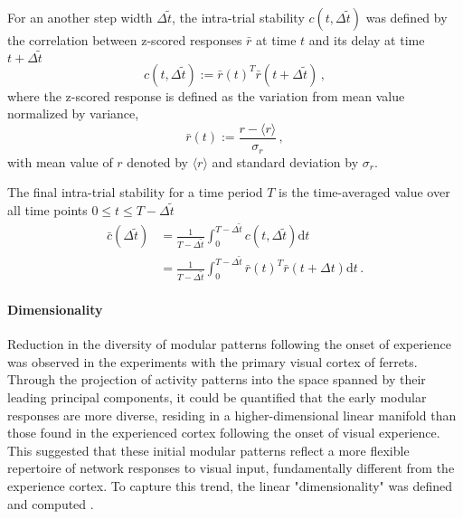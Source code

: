 \documentclass[11pt]{article}
\begin{document}
	For an another step width $\Delta \tilde{t}$, the intra-trial stability $c(t, \Delta \tilde{t})$ was defined by the correlation between z-scored responses $\bar{r}$ at time $t$ and its delay at time $t + \Delta \tilde{t}$ 
		\begin{equation}
			c(t, \Delta \tilde{t}) := \bar{r}(t)^T \bar{r}(t + \Delta \tilde{t}) \, , 
		\end{equation}
	where the z-scored response is defined as the variation from mean value normalized by variance, 
		\begin{equation}
			\bar{r}(t) := \frac{r - \langle r \rangle}{\sigma_r} \, ,
		\end{equation}
	with mean value of $r$ denoted by $\langle r \rangle$ and standard deviation by $\sigma_r$. 
	
	The final intra-trial stability for a time period $T$ is the time-averaged value over all time points $0 \leq t \leq T - \Delta \tilde{t}$
		\begin{equation} \label{eq:its_sym}
			\begin{split}
				\bar{c}{(\Delta \tilde{t})} &= \frac{1}{T-\Delta \tilde{t}} \int_{0}^{T-\Delta \tilde{t}} c(t, \Delta \tilde{t}) \mathrm{d} t\\
				                            &= \frac{1}{T-\Delta \tilde{t}} \int_{0}^{T-\Delta \tilde{t}} \bar{r}(t)^T \bar{r}(t + \Delta t) \mathrm{d} t \, .
			\end{split} 
		\end{equation}
	
	\paragraph{Dimensionality}
	
	Reduction in the diversity of modular patterns following the onset of experience was observed in the experiments with the primary visual cortex of ferrets. Through the projection of activity patterns into the space spanned by their leading principal components, it could be quantified that the early modular responses are more diverse, residing in a higher-dimensional linear manifold than those found in the experienced cortex following the onset of visual experience. This suggested that these initial modular patterns reflect a more flexible repertoire of network responses to visual input, fundamentally different from the experience cortex. To capture this trend, the linear "dimensionality" was defined and computed \cite{tragenap2023nature}. 
	
\end{document}
